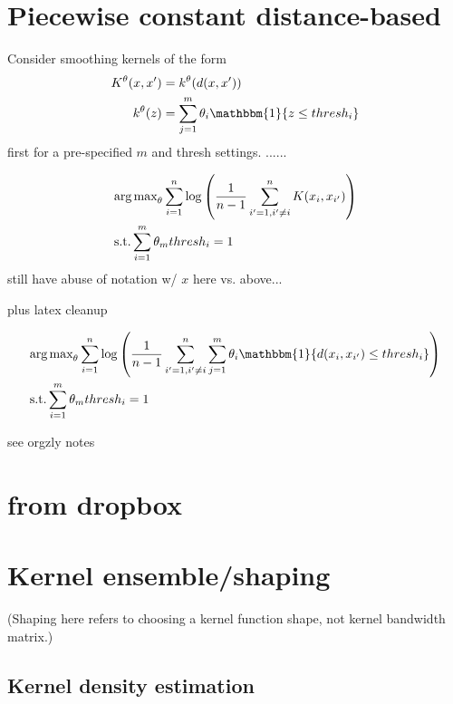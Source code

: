 \documentclass{article}
\begin{document}
\section{Piecewise constant distance-based}

Consider smoothing kernels of the form
\begin{align*}
K^\theta(x, x') &{}= k^\theta(d(x, x')) \\
k^\theta(z) &{}= \sum_{j=1}^m \theta_i \mathbbm{1}\{z \le thresh_i\}
\end{align*}
first for a pre-specified $m$ and thresh settings.
......


\begin{align*}
  & \text{arg\,max}_\theta \sum_{i=1}^n \log\left( \frac1{n-1} \sum_{i'=1,i'\neq i}^n K(x_i, x_{i'}) \right)
  \\ & \text{s.t.} \sum_{i=1}^m \theta_m thresh_i = 1
\end{align*}
still have abuse of notation w/ $x$ here vs. above...

plus latex cleanup

\begin{align*}
  & \text{arg\,max}_\theta \sum_{i=1}^n \log\left( \frac1{n-1} \sum_{i'=1,i'\neq i}^n \sum_{j=1}^m \theta_i \mathbbm{1}\{d(x_i, x_{i'}) \le thresh_i\} \right)
  \\ & \text{s.t.} \sum_{i=1}^m \theta_m thresh_i = 1
\end{align*}



see orgzly notes


\section{from dropbox}


\section{Kernel ensemble/shaping}

(Shaping here refers to choosing a kernel function shape, not kernel bandwidth matrix.)

\subsection{Kernel density estimation}
\end{document}
